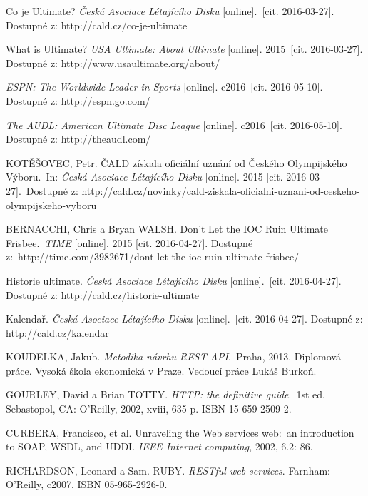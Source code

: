 \begin{thebibliography}{1}

Co je Ultimate? \textit{Česká Asociace Létajícího Disku} [online].\
[cit. 2016-03-27]. Dostupné z: http://cald.cz/co-je-ultimate

What is Ultimate? \textit{USA Ultimate: About Ultimate} [online]. 2015\
[cit. 2016-03-27]. Dostupné z: http://www.usaultimate.org/about/

\bibitem{espn}
\textit{ESPN: The Worldwide Leader in Sports} [online]. c2016\
[cit. 2016-05-10]. Dostupné z: http://espn.go.com/

\bibitem{audl}
\textit{The AUDL: American Ultimate Disc League} [online]. c2016\
[cit. 2016-05-10]. Dostupné z: http://theaudl.com/

KOTĚŠOVEC, Petr. ČALD získala oficiální uznání od Českého Olympijského Výboru.\
In: \textit{Česká Asociace Létajícího Disku} [online]. 2015 [cit. 2016-03-27].\
Dostupné z: http://cald.cz/novinky/cald-ziskala-oficialni-uznani-od-ceskeho-olympijskeho-vyboru

BERNACCHI, Chris a Bryan WALSH. Don’t Let the IOC Ruin Ultimate Frisbee.\
\textit{TIME} [online]. 2015 [cit. 2016-04-27]. Dostupné z:\
http://time.com/3982671/dont-let-the-ioc-ruin-ultimate-frisbee/



 Historie ultimate. \textit{Česká Asociace Létajícího Disku} [online].\
[cit. 2016-04-27]. Dostupné z: http://cald.cz/historie-ultimate

\bibitem{cald_kalendar} Kalendař. \textit{Česká Asociace Létajícího Disku} [online].\
[cit. 2016-04-27]. Dostupné z: http://cald.cz/kalendar

\bibitem{rest_vse}
KOUDELKA, Jakub. \textit{Metodika návrhu REST API}.\
Praha, 2013. Diplomová práce. Vysoká škola ekonomická v Praze. Vedoucí práce Lukáš Burkoň.

GOURLEY, David a Brian TOTTY. \textit{HTTP: the definitive guide}.\
1st ed. Sebastopol, CA: O’Reilly, 2002, xviii, 635 p. ISBN 15-659-2509-2.

CURBERA, Francisco, et al. Unraveling the Web services web:\
an introduction to SOAP, WSDL, and UDDI. \textit{IEEE Internet computing}, 2002, 6.2: 86.

RICHARDSON, Leonard a Sam. RUBY. \textit{RESTful web services}. Farnham: O'Reilly, c2007. ISBN 05-965-2926-0.


\end{thebibliography}
